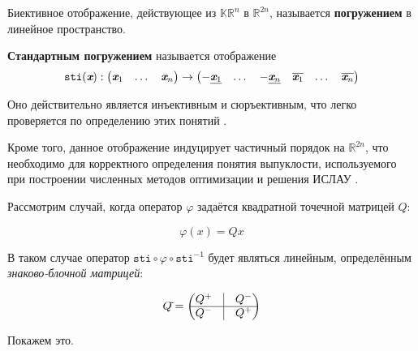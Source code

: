 \begin{definition}
	Биективное отображение, действующее из $\mathbb{KR}^{n}$ в $\mathbb{R}^{2n}$, называется \textbf{погружением} в линейное пространство.
\end{definition}

\begin{definition}
\textbf{Стандартным погружением} называется отображение
\begin{equation}
\mathtt{sti}(\textit{\textbf{x}}): 
\begin{pmatrix}
\textit{\textbf{x}}_1 & \dots & \textit{\textbf{x}}_n
\end{pmatrix}
\rightarrow
\begin{pmatrix}
-\underline{\textit{\textbf{x}}_1} & \dots & -\underline{\textit{\textbf{x}}_n} & 
\overline{\textit{\textbf{x}}_1} & \dots &
\overline{\textit{\textbf{x}}_n}
\end{pmatrix}
\end{equation}
\end{definition}

Оно действительно является инъективным и сюръективным, что легко проверяется по определению этих понятий \cite[Лекция 11]{intv}.

Кроме того, данное отображение индуцирует частичный порядок на $\mathbb{R}^{2n}$, что необходимо для корректного определения понятия выпуклости, используемого при построении численных методов оптимизации и решения ИСЛАУ \cite[стр. 580]{shary}.

Рассмотрим случай, когда оператор $\varphi$ задаётся квадратной точечной матрицей $Q$:

\begin{equation}
\varphi(x)=Qx
\end{equation}

В таком случае оператор $\mathtt{sti} \circ \varphi \circ \mathtt{sti}^{-1}$ будет являться линейным, определённым \textit{знаково-блочной матрицей}:

\begin{equation}
Q\tilde{} =
\begin{pmatrix}
Q^+ & \vrule & Q^- \\
\hline
Q^- & \vrule & Q^+
\end{pmatrix}
\end{equation}

Покажем это.

